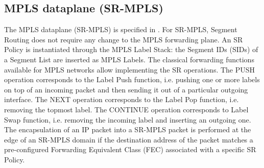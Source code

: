 \subsection{MPLS dataplane (SR-MPLS)}
\label{sec:mpls-dataplane}

The MPLS dataplane (SR-MPLS) is specified in \cite{id-segment-routing-mpls}. For SR-MPLS, Segment Routing does not require any change to the MPLS forwarding plane. An SR Policy is instantiated through the MPLS Label Stack: the Segment IDs (SIDs) of a Segment List are inserted as MPLS Labels. 
The classical forwarding functions available for MPLS networks allow implementing the SR operations. The PUSH operation corresponds to the Label Push function, i.e. pushing one or more labels on top of an incoming packet and then sending it out of a particular outgoing interface. The NEXT operation corresponds to the Label Pop function, i.e. removing the topmost label. The CONTINUE operation corresponds to Label Swap function, i.e. removing the incoming label and inserting an outgoing one. 
The encapsulation of an IP packet into a SR-MPLS packet is performed at the edge of an SR-MPLS domain if the destination address of the packet matches a pre-configured Forwarding Equivalent Class (FEC) associated with a specific SR Policy.

